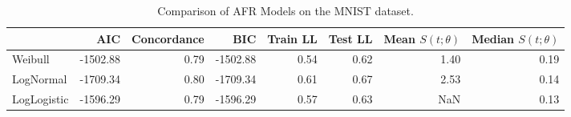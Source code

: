 \begin{table}
\caption{Comparison of AFR Models on the MNIST dataset.}
\label{tab:mnist}
\begin{tabular}{lrrrrrrr}
\toprule
 & AIC & Concordance & BIC & Train LL & Test LL & Mean $S(t;\theta)$ & Median $S(t;\theta)$ \\
\midrule
Weibull & -1502.88 & 0.79 & -1502.88 & 0.54 & 0.62 & 1.40 & 0.19 \\
LogNormal & -1709.34 & 0.80 & -1709.34 & 0.61 & 0.67 & 2.53 & 0.14 \\
LogLogistic & -1596.29 & 0.79 & -1596.29 & 0.57 & 0.63 & NaN & 0.13 \\
\bottomrule
\end{tabular}
\end{table}
